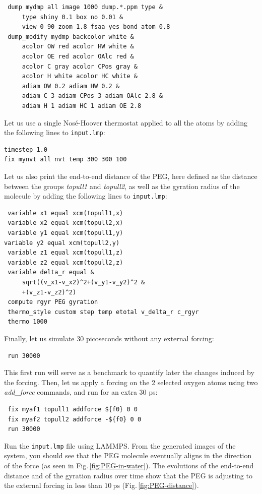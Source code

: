 \documentclass[9pt,tutorial]{livecoms}
\newcommand{\flecmd}[1]{\textcolor{command}{\texttt{#1}}} %
\begin{document}
\begin{lstlisting}
 dump mydmp all image 1000 dump.*.ppm type &
     type shiny 0.1 box no 0.01 &
     view 0 90 zoom 1.8 fsaa yes bond atom 0.8
 dump_modify mydmp backcolor white &
     acolor OW red acolor HW white &
     acolor OE red acolor OAlc red &
     acolor C gray acolor CPos gray &
     acolor H white acolor HC white &
     adiam OW 0.2 adiam HW 0.2 &
     adiam C 3 adiam CPos 3 adiam OAlc 2.8 &
     adiam H 1 adiam HC 1 adiam OE 2.8
\end{lstlisting}
Let us use a single Nosé-Hoover thermostat applied to all the atoms by adding the
following lines to \flecmd{input.lmp}:
\begin{lstlisting}
timestep 1.0
fix mynvt all nvt temp 300 300 100
\end{lstlisting}
Let us also print the end-to-end distance of the PEG,
here defined as the distance between the groups \textit{topull1}
and \textit{topull2}, as well as the gyration
radius of the molecule \cite{fixmanRadiusGyrationPolymer1962a}
by adding the following lines to \flecmd{input.lmp}:
\begin{lstlisting}
 variable x1 equal xcm(topull1,x)
 variable x2 equal xcm(topull2,x)
 variable y1 equal xcm(topull1,y)
variable y2 equal xcm(topull2,y)
 variable z1 equal xcm(topull1,z)
 variable z2 equal xcm(topull2,z)
 variable delta_r equal &
     sqrt((v_x1-v_x2)^2+(v_y1-v_y2)^2 &
     +(v_z1-v_z2)^2)
 compute rgyr PEG gyration
 thermo_style custom step temp etotal v_delta_r c_rgyr
 thermo 1000
\end{lstlisting}
Finally, let us simulate 30 picoseconds without any external forcing:
\begin{lstlisting}
 run 30000
\end{lstlisting}
This first run will serve as a benchmark to quantify later the changes induced
by the forcing. Then, let us apply a forcing on the 2 selected oxygen atoms using two
\textit{add\_force} commands, and run for an extra 30 ps:
\begin{lstlisting}
 fix myaf1 topull1 addforce ${f0} 0 0
 fix myaf2 topull2 addforce -${f0} 0 0
 run 30000
\end{lstlisting}
Run the \flecmd{input.lmp} file using LAMMPS. From the generated images of the system,
you should see that the PEG molecule eventually aligns
in the direction of the force (as seen in Fig.\,\ref{fig:PEG-in-water}).
The evolutions of the end-to-end distance and of the gyration radius over
time show that the PEG is adjusting to the external forcing in less than
$10~\text{ps}$ (Fig.\,\ref{fig:PEG-distance}).
\end{document}
